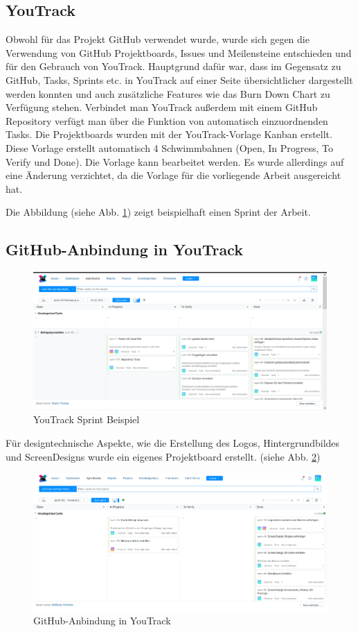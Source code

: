 \subsection{YouTrack}
Obwohl für das Projekt GitHub verwendet wurde, wurde sich gegen die Verwendung von GitHub Projektboards, Issues und Meilensteine
entschieden und für den Gebrauch von YouTrack. Hauptgrund dafür war, dass im Gegensatz zu GitHub, 
Tasks, Sprints etc. in YouTrack auf einer Seite übersichtlicher dargestellt werden konnten und auch 
zusätzliche Features wie das Burn Down Chart zu Verfügung stehen. Verbindet man YouTrack außerdem 
mit einem GitHub Repository verfügt man über die Funktion von automatisch einzuordnenden
Tasks. Die Projektboards wurden mit der YouTrack-Vorlage Kanban erstellt. 
Diese Vorlage erstellt automatisch 4 Schwimmbahnen (Open, In Progress, To Verify und Done). Die Vorlage kann bearbeitet werden. 
Es wurde allerdings auf eine Änderung verzichtet, da die Vorlage für die vorliegende Arbeit ausgereicht hat.

Die Abbildung (siehe Abb. \ref{fig:youtracksprint}) zeigt beispielhaft einen Sprint der Arbeit.
\subsection{GitHub-Anbindung in YouTrack}
\begin{figure}[H]
    \includegraphics[width=1.0\textwidth]{pics/YouTrack.PNG}
    \centering
    \caption{YouTrack Sprint Beispiel}
    \label{fig:youtracksprint}
\end{figure}

Für designtechnische Aspekte, wie die Erstellung des Logos, Hintergrundbildes und ScreenDesigns wurde ein eigenes Projektboard 
erstellt. (siehe Abb. \ref{fig:youtracksprint2})  
\begin{figure}[H]
    \includegraphics[width=1.0\textwidth]{pics/YouTrackfrontendboard.PNG}
    \centering
    \caption{GitHub-Anbindung in YouTrack}
    \label{fig:youtracksprint2}
\end{figure}


